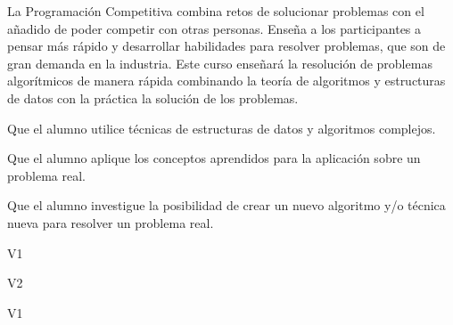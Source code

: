 \begin{syllabus}


\begin{justification}
    La Programación Competitiva combina retos de solucionar problemas con el añadido de poder competir con otras personas. Enseña a los participantes a pensar más rápido y desarrollar habilidades para resolver problemas, que son de gran demanda en la industria. 
    Este curso enseñará la resolución de problemas algorítmicos de manera rápida combinando la teoría de algoritmos y estructuras de datos con la práctica la solución de los problemas.
  \end{justification}
  
  \begin{goals}
    \item Que el alumno utilice técnicas de estructuras de datos y algoritmos complejos.
    \item Que el alumno aplique los conceptos aprendidos para la aplicación sobre un problema real.
    \item Que el alumno investigue la posibilidad de crear un nuevo algoritmo y/o técnica nueva para resolver un problema real.
  \end{goals}
  
  \begin{outcomes}{V1}
      \item {}
      \item {}
      \item {}
  \end{outcomes}
  
  \begin{outcomes}{V2}
      \item {}
      \item {}
      \item {}
      \item {}
  \end{outcomes}
  
  \begin{competences}{V1}
      \item {}
      \item {}
      \item {}
  \end{competences}
  

\end{syllabus}
